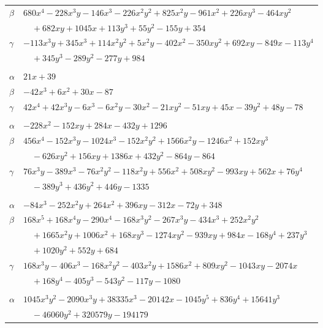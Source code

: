 \documentclass[11pt]{article}
\begin{document}
\begin{longtable}{@{}ll@{}}
$\beta$ & $680x^{4}-228x^{3}y-146x^{3}-226x^{2}y^{2}+825x^{2}y-961x^{2}+226xy^{3}-464xy^{2}$\\
 & $\quad +682xy+1045x+113y^{3}+55y^{2}-155y+354$\\
$\gamma$ & $-113x^{3}y+345x^{3}+114x^{2}y^{2}+5x^{2}y-402x^{2}-350xy^{2}+692xy-849x-113y^{4}$\\
 & $\quad +345y^{3}-289y^{2}-277y+984$\\
\addlinespace[3pt]
\multicolumn{2}{@{}l}{$\{i,j\}=\{3,102\}$, $k_{ij}=2^{2}\cdot 3^{3}$}\\
$\alpha$ & $21x+39$\\
$\beta$ & $-42x^{3}+6x^{2}+30x-87$\\
$\gamma$ & $42x^{4}+42x^{3}y-6x^{3}-6x^{2}y-30x^{2}-21xy^{2}-51xy+45x-39y^{2}+48y-78$\\
\addlinespace[3pt]
\multicolumn{2}{@{}l}{$\{i,j\}=\{3,115\}$, $k_{ij}=2^{4}\cdot 3^{3}\cdot 7$}\\
$\alpha$ & $-228x^{2}-152xy+284x-432y+1296$\\
$\beta$ & $456x^{4}-152x^{3}y-1024x^{3}-152x^{2}y^{2}+1566x^{2}y-1246x^{2}+152xy^{3}$\\
 & $\quad -626xy^{2}+156xy+1386x+432y^{2}-864y-864$\\
$\gamma$ & $76x^{3}y-389x^{3}-76x^{2}y^{2}-118x^{2}y+556x^{2}+508xy^{2}-993xy+562x+76y^{4}$\\
 & $\quad -389y^{3}+436y^{2}+446y-1335$\\
\addlinespace[3pt]
\multicolumn{2}{@{}l}{$\{i,j\}=\{3,116\}$, $k_{ij}=2^{6}\cdot 3^{3}$}\\
$\alpha$ & $-84x^{3}-252x^{2}y+264x^{2}+396xy-312x-72y+348$\\
$\beta$ & $168x^{5}+168x^{4}y-290x^{4}-168x^{3}y^{2}-267x^{3}y-434x^{3}+252x^{2}y^{2}$\\
 & $\quad +1665x^{2}y+1006x^{2}+168xy^{3}-1274xy^{2}-939xy+984x-168y^{4}+237y^{3}$\\
 & $\quad +1020y^{2}+552y+684$\\
$\gamma$ & $168x^{3}y-406x^{3}-168x^{2}y^{2}-403x^{2}y+1586x^{2}+809xy^{2}-1043xy-2074x$\\
 & $\quad +168y^{4}-405y^{3}-543y^{2}-117y-1080$\\
\addlinespace[3pt]
\multicolumn{2}{@{}l}{$\{i,j\}=\{3,117\}$, $k_{ij}=2^{6}\cdot 3^{4}\cdot 7\cdot 13$}\\
$\alpha$ & $1045x^{3}y^{2}-2090x^{3}y+38335x^{3}-20142x-1045y^{5}+836y^{4}+15641y^{3}$\\
 & $\quad -46060y^{2}+320579y-194179$\\

\end{longtable}
\end{document}
